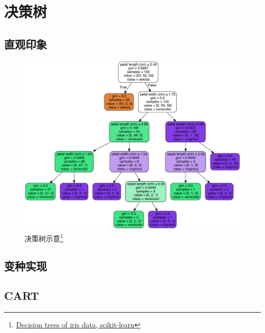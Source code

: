
\section{决策树}
\subsection{直观印象}
\begin{frame}
    \begin{figure}[!tb]
        \includegraphics[width=\onepicwidth]{figure/decision_tree/iris}
        \caption{决策树示意\footnote{
                 \href{http://scikit-learn.org/stable/modules/tree.html}{Decision trees of iris data, scikit-learn}}}
    \end{figure}
\end{frame}

\subsection{变种实现}

\subsection{CART}

